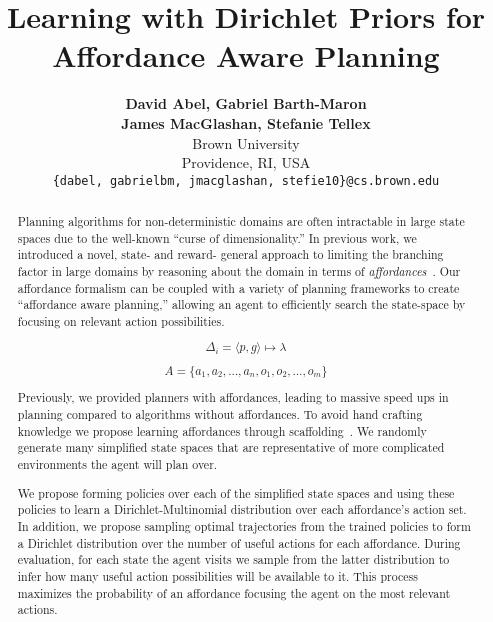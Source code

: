 \documentclass[]{article}
\title{\textbf{Learning with Dirichlet Priors for \\Affordance Aware Planning}}
\begin{document}
\author{
\textbf{David Abel, Gabriel Barth-Maron} \\ \textbf{James MacGlashan, Stefanie Tellex} \\
Brown University \\
Providence, RI, USA \\
\texttt{\{dabel, gabrielbm, jmacglashan, stefie10\}@cs.brown.edu}}

\date{}
\maketitle

\begin{abstract}
Planning algorithms for non-deterministic domains are often
intractable in large state spaces due to the well-known ``curse of
dimensionality.'' In previous work, we introduced a novel, state- and reward- general approach to limiting the
branching factor in large domains by reasoning about the
domain in terms of {\em affordances}~\citep{gibson77}.  Our affordance
formalism can be coupled with a variety of planning frameworks to
create ``affordance aware planning,'' allowing an agent to efficiently
search the state-space by focusing on relevant action possibilities. 


\[
\Delta_i = \langle p, g \rangle \longmapsto \lambda
\]

\[
A = \{a_1, a_2, \ldots, a_n, o_1, o_2, \ldots, o_m\}
\]



  
Previously, we provided planners with affordances, leading to massive
speed ups in planning compared to algorithms without affordances. 
To avoid hand crafting knowledge we propose learning affordances through scaffolding~\citep{bruner76}. We randomly generate many simplified state spaces that are
representative of more complicated environments the agent will plan over.

We propose forming policies over each of the simplified state spaces and using these policies to learn a
Dirichlet-Multinomial distribution over each affordance's action set. In addition, we propose sampling optimal trajectories from the trained policies to form a Dirichlet distribution over the number of useful actions for each affordance. During evaluation, for each state the agent visits we sample from the latter distribution to infer how many useful action possibilities will be available to it. This process maximizes the probability of an affordance focusing the agent on the most relevant actions.


\end{abstract}
\end{document}

